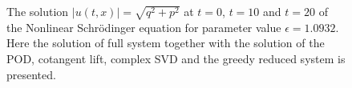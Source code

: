 \begin{figure}
\caption{The solution $|u(t,x)| = \sqrt{q^2 + p^2}$ at $t=0$, $t=10$ and $t=20$ of the Nonlinear Schr\"odinger equation for parameter value $\epsilon = 1.0932$. Here the solution of full system together with the solution of the POD, cotangent lift, complex SVD and the greedy reduced system is presented.}
\label{fig:NuRe:3}
\end{figure}

\begin{figure}

\begin{minipage}{.5\linewidth}
\centering
{}
\end{minipage}%
\begin{minipage}{.5\linewidth}
\centering
{}
\end{minipage}\par\medskip
\centering
{}


\end{figure}
